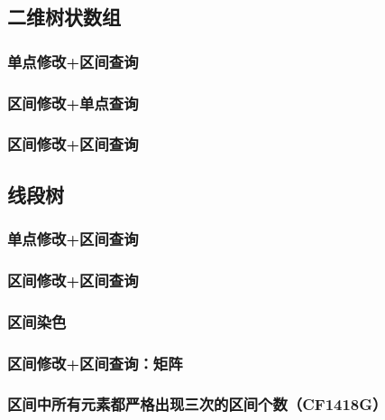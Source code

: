 \documentclass[twoside,a4paper]{article}
\begin{document}
\subsection{二维树状数组}

\subsubsection{单点修改+区间查询}


\subsubsection{区间修改+单点查询}


\subsubsection{区间修改+区间查询}



\subsection{线段树}

\subsubsection{单点修改+区间查询}


\subsubsection{区间修改+区间查询}


\subsubsection{区间染色}


\subsubsection{区间修改+区间查询：矩阵}


\subsubsection{区间中所有元素都严格出现三次的区间个数（CF1418G）}

\end{document}
